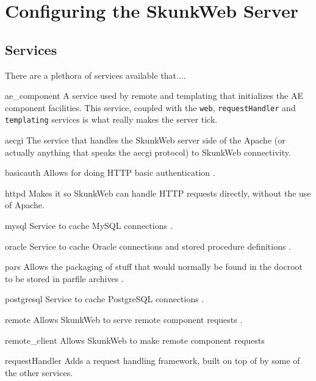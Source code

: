 \documentclass[titlepage]{manual}
\begin{document}
\chapter{Configuring the SkunkWeb Server}

\section{Services}
There are a plethora of services available that....
\begin{argdesc}
\item[ae_component] A service used by remote and templating that
initializes the AE component facilities.  This service, coupled with
the \texttt{web}, \texttt{requestHandler} and \texttt{templating}
services is what really makes the server tick.

\item[aecgi] The service that handles the SkunkWeb server side of the
Apache (or actually anything that speaks the aecgi protocol) to
SkunkWeb connectivity.

\item[basicauth]  Allows for doing HTTP basic authentication .

\item[httpd] Makes it so SkunkWeb can handle HTTP requests directly,
without the use of Apache.

\item[mysql] Service to cache MySQL connections
.

\item[oracle] Service to cache Oracle connections and stored procedure
definitions .

\item[pars]  Allows the packaging of stuff that would normally be found in
the docroot to be stored in parfile archives .

\item[postgresql] Service to cache PostgreSQL connections
.

\item[remote] Allows SkunkWeb to serve remote component requests
.

\item[remote_client] Allows SkunkWeb to make remote component requests

\item[requestHandler]  Adds a request handling framework, built on top
of by some of the other services.


\end{argdesc}
\end{document}
